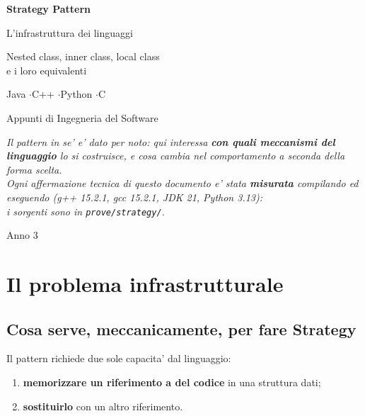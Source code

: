 \documentclass{report}
\newcommand{\code}[1]{\texttt{\small #1}}
\begin{document}
\begin{titlepage}
    \centering
    \vspace*{2.0cm}
    {\Huge\sffamily\bfseries Strategy Pattern\par}
    \vspace{0.35cm}
    {\LARGE\sffamily L'infrastruttura dei linguaggi\par}
    \vspace{0.9cm}
    {\large\sffamily Nested class, inner class, local class\\
    e i loro equivalenti\par}
    \vspace{1.0cm}
    {\LARGE\sffamily Java \quad$\cdot$\quad C++ \quad$\cdot$\quad Python \quad$\cdot$\quad C\par}
    \vspace{1.3cm}
    {\Large Appunti di Ingegneria del Software\par}
    \vspace{1.3cm}
    {\footnotesize\itshape Il pattern in se' e' dato per noto: qui interessa
    \textbf{con quali meccanismi del linguaggio} lo si costruisce, e cosa
    cambia nel comportamento a seconda della forma scelta.\\[6pt]
    Ogni affermazione tecnica di questo documento e' stata
    \textbf{misurata} compilando ed eseguendo
    (g++ 15.2.1, gcc 15.2.1, JDK 21, Python 3.13):\\
    i sorgenti sono in \code{prove/strategy/}.\par}
    \vfill
    {\large Anno 3\par}
\end{titlepage}

\tableofcontents
\newpage

\chapter{Il problema infrastrutturale}\label{ch:infra}

\section{Cosa serve, meccanicamente, per fare Strategy}

Il pattern richiede due sole capacita' dal linguaggio:

\begin{enumerate}
    \item \textbf{memorizzare un riferimento a del codice} in una
          struttura dati;
    \item \textbf{sostituirlo} con un altro riferimento.
\end{enumerate}
\end{document}
